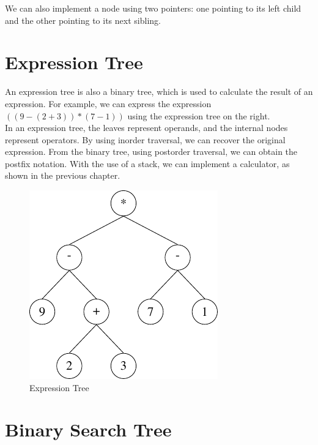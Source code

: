 We can also implement a node using two pointers: one pointing to its left child and the other pointing to its next sibling.

\section{Expression Tree}
\begin{minipage}{0.6\textwidth}
An expression tree is also a binary tree, which is used to calculate the result of an expression. For example, we can express the expression \(((9 - (2 + 3)) * (7 - 1))\) using the  expression tree on the right.\\[5pt]
In an expression tree, the leaves represent operands, and the internal nodes represent operators. By using inorder traversal, we can recover the original expression. From the binary tree, using postorder traversal, we can obtain the postfix notation. With the use of a stack, we can implement a calculator, as shown in the previous chapter.
\end{minipage}
\begin{minipage}{0.4\textwidth}
\begin{figure}[H]
  \centering
  \includegraphics[height=0.6\textwidth]{Figure/Expression-Tree.pdf}
  \caption{Expression Tree}
\end{figure}
\end{minipage}

\section{Binary Search Tree}
